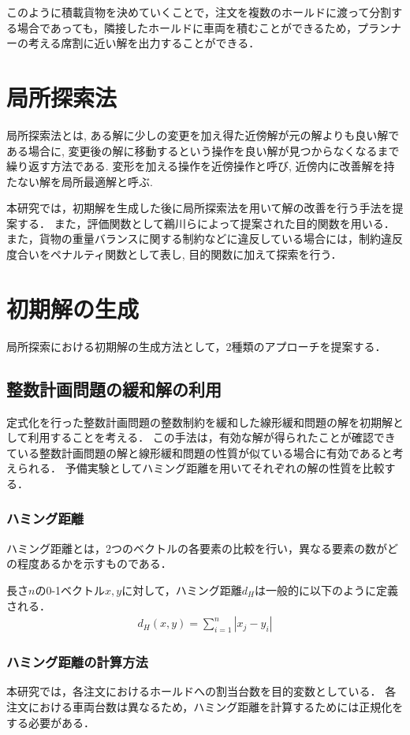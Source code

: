 このように積載貨物を決めていくことで，注文を複数のホールドに渡って分割する場合であっても，隣接したホールドに車両を積むことができるため，プランナーの考える席割に近い解を出力することができる．

\section{局所探索法}
局所探索法とは, ある解に少しの変更を加え得た近傍解が元の解よりも良い解である場合に, 変更後の解に移動するという操作を良い解が見つからなくなるまで繰り返す方法である.
変形を加える操作を近傍操作と呼び, 近傍内に改善解を持たない解を局所最適解と呼ぶ.

本研究では，初期解を生成した後に局所探索法を用いて解の改善を行う手法を提案する．
また，評価関数として鵜川ら\cite{ukawa}によって提案された目的関数を用いる．
また，貨物の重量バランスに関する制約などに違反している場合には，制約違反度合いをペナルティ関数として表し, 目的関数に加えて探索を行う．

\section{初期解の生成}
\label{initial}
局所探索における初期解の生成方法として，2種類のアプローチを提案する．
\subsection{整数計画問題の緩和解の利用}
\label{relaxation}
定式化を行った整数計画問題の整数制約を緩和した線形緩和問題の解を初期解として利用することを考える．
この手法は，有効な解が得られたことが確認できている整数計画問題の解と線形緩和問題の性質が似ている場合に有効であると考えられる．
予備実験としてハミング距離を用いてそれぞれの解の性質を比較する．

\subsubsection{ハミング距離}
ハミング距離とは，2つのベクトルの各要素の比較を行い，異なる要素の数がどの程度あるかを示すものである．

長さ$n$の0-1ベクトル$x,y$に対して，ハミング距離$d_H$は一般的に以下のように定義される．
\begin{align*}
 d_H(x,y) =\sum_{i=1}^n |x_j-y_i|
\end{align*}

\subsubsection{ハミング距離の計算方法}
本研究では，各注文におけるホールドへの割当台数を目的変数としている．
各注文における車両台数は異なるため，ハミング距離を計算するためには正規化をする必要がある．

